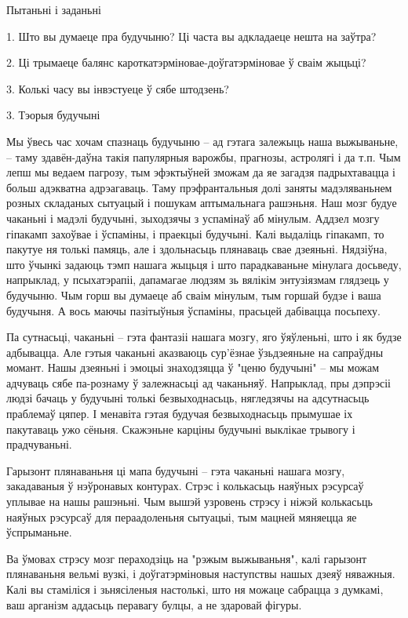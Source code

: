 Пытаньні і заданьні

1. Што вы думаеце пра будучыню? Ці часта вы адкладаеце нешта на заўтра?

2. Ці трымаеце балянс кароткатэрміновае-доўгатэрміновае ў сваім жыцьці?

3. Колькі часу вы інвэстуеце ў сябе штодзень?


3. Тэорыя будучыні

Мы ўвесь час хочам спазнаць будучыню – ад гэтага залежыць наша выжываньне, – таму здавён-даўна такія папулярныя варожбы, прагнозы, астролягі і да т.п. Чым лепш мы ведаем пагрозу, тым эфэктыўней зможам да яе загадзя падрыхтавацца і больш адэкватна адрэагаваць. Таму прэфрантальныя долі заняты мадэляваньнем розных складаных сытуацый і пошукам аптымальнага рашэньня. Наш мозг будуе чаканьні і мадэлі будучыні, зыходзячы з успамінаў аб мінулым. Аддзел мозгу гіпакамп захоўвае і ўспаміны, і праекцыі будучыні. Калі выдаліць гіпакамп, то пакутуе ня толькі памяць, але і здольнасьць плянаваць свае дзеяньні. Нядзіўна, што ўчынкі задаюць тэмп нашага жыцьця і што парадкаваньне мінулага досьведу, напрыклад, у псыхатэрапіі, дапамагае людзям зь вялікім энтузіязмам глядзець у будучыню. Чым горш вы думаеце аб сваім мінулым, тым горшай будзе і ваша будучыня. А вось маючы пазітыўныя ўспаміны, прасьцей дабівацца посьпеху.

Па сутнасьці, чаканьні – гэта фантазіі нашага мозгу, яго ўяўленьні, што і як будзе адбывацца. Але гэтыя чаканьні аказваюць сур'ёзнае ўзьдзеяньне на сапраўдны момант. Нашы дзеяньні і эмоцыі знаходзяцца ў "ценю будучыні" – мы можам адчуваць сябе па-рознаму ў залежнасьці ад чаканьняў. Напрыклад, пры дэпрэсіі людзі бачаць у будучыні толькі безвыходнасьць, нягледзячы на адсутнасьць праблемаў цяпер. І менавіта гэтая будучая безвыходнасьць прымушае іх пакутаваць ужо сёньня. Скажэньне карціны будучыні выклікае трывогу і прадчуваньні.

Гарызонт плянаваньня ці мапа будучыні – гэта чаканьні нашага мозгу, закадаваныя ў нэўронавых контурах. Стрэс і колькасьць наяўных рэсурсаў уплывае на нашы рашэньні. Чым вышэй узровень стрэсу і ніжэй колькасьць наяўных рэсурсаў для пераадоленьня сытуацыі, тым мацней мяняецца яе ўспрыманьне.

Ва ўмовах стрэсу мозг пераходзіць на "рэжым выжываньня", калі гарызонт плянаваньня вельмі вузкі, і доўгатэрміновыя наступствы нашых дзеяў няважныя. Калі вы стаміліся і зьнясіленыя настолькі, што ня можаце сабрацца з думкамі, ваш арганізм аддасьць перавагу булцы, а не здаровай фігуры.

